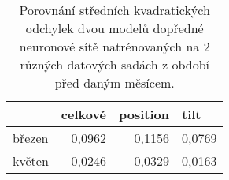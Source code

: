 \begin{table}[htbp]
  \centering
  \begin{tabular}{l|r|r|r}
    \toprule
          & \multicolumn{1}{l|}{celkově} & \multicolumn{1}{l|}{position} & \multicolumn{1}{l}{tilt} \\
    \midrule
    \midrule
    březen & 0,0962 & 0,1156 & 0,0769 \\
    \midrule
    květen & 0,0246 & 0,0329 & 0,0163 \\
    \bottomrule
    \bottomrule
    \end{tabular}%
  \caption[Retraining FFNN]{Porovnání středních kvadratických odchylek dvou modelů dopředné neuronové sítě natrénovaných na 2 různých datových sadách z období před daným měsícem.}
  \label{tab:retr_ffnn}%
\end{table}%
